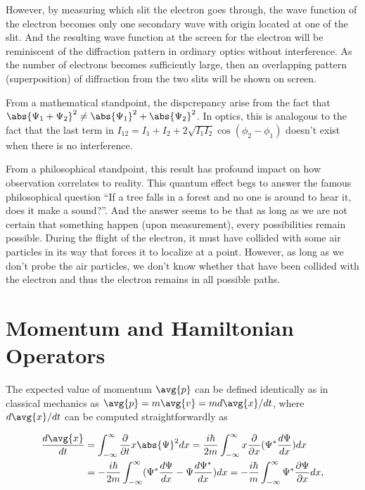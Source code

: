 \documentclass[a4paper,12pt]{report}
\begin{document}
However, by measuring which slit the electron goes through, the wave function of the electron becomes only one secondary wave with origin located at one of the slit. And the resulting wave function at the screen for the electron will be reminiscent of the diffraction pattern in ordinary optics without interference. As the number of electrons becomes sufficiently large, then an overlapping pattern (superposition) of diffraction from the two slits will be shown on screen.

From a mathematical standpoint, the dispcrepancy arise from the fact that \(\abs{\Psi_1 + \Psi_2}^2 \neq \abs{\Psi_1}^2 + \abs{\Psi_2}^2\). In optics, this is analogous to the fact that the last term in \(I_{12} = I_1 + I_2 + 2\sqrt{I_1I_2} \cos(\phi_2 - \phi_1)\) doesn't exist when there is no interference. 

From a philosophical standpoint, this result has profound impact on how observation correlates to reality. This quantum effect begs to answer the famous philosophical question ``If a tree falls in a forest and no one is around to hear it, does it make a sound?''. And the answer seems to be that as long as we are not certain that something happen (upon measurement), every possibilities remain possible. During the flight of the electron, it must have collided with some air particles in its way that forces it to localize at a point. However, as long as we don't probe the air particles, we don't know whether that have been collided with the electron and thus the electron remains in all possible paths.

\section{Momentum and Hamiltonian Operators}
	
The expected value of momentum \(\avg{p} \) can be defined identically as in classical mechanics as \(\avg{p} =m\avg{v} =md \avg{x} /dt\), where \(d \avg{x} /dt \) can be computed straightforwardly as 
	
\begin{equation}
  \begin{aligned}
    \frac{ d\avg{x} }{ dt} &= \int_{-\infty}^{\infty} \frac{\partial }{\partial t} x \abs{\Psi }^2 dx = \frac{i\hbar }{2m} \int_{-\infty}^{\infty} x \frac{\partial }{\partial x} (\Psi ^* \frac{d\Psi}{dx} )dx \\ &= -\frac{i\hbar }{2m} \int_{-\infty}^{\infty} (\Psi ^* \frac{ d\Psi }{ dx} - \Psi \frac{ d\Psi ^*}{ dx} ) dx = -\frac{i\hbar }{m} \int_{-\infty}^{\infty} \Psi ^* \frac{\partial \Psi }{\partial x} dx,          
  \end{aligned}
\end{equation}
	
\end{document}
